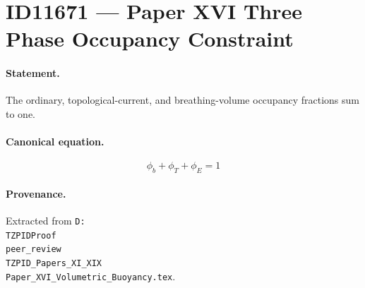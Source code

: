 \section*{ID11671 --- Paper XVI Three Phase Occupancy Constraint}

\paragraph{Statement.}
The ordinary, topological-current, and breathing-volume occupancy fractions sum to one.

\paragraph{Canonical equation.}
\[
\phi_b+\phi_T+\phi_E=1
\]

\paragraph{Provenance.}
Extracted from \texttt{D:\\TZPIDProof\\peer\_review\\TZPID\_Papers\_XI\_XIX\\Paper\_XVI\_Volumetric\_Buoyancy.tex}.
